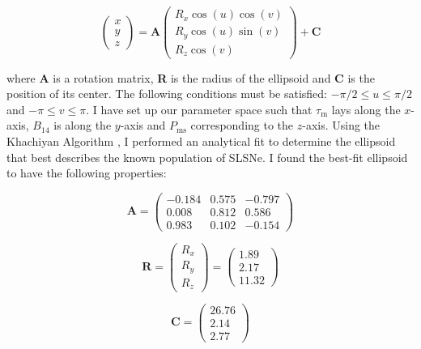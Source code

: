 \begin{equation}
\label{eq:Ellipsoid}
\left( \begin{matrix}
x \\
y \\
z
\end{matrix} \right)
=
\mathbf{A}
\left( \begin{matrix}
R_x\cos(u)\cos(v) \\
R_y\cos(u)\sin(v) \\
R_z\cos(v)
\end{matrix} \right)
+ \mathbf{C}
\end{equation}

\noindent where \textbf{A} is a rotation matrix, \textbf{R} is the radius of the ellipsoid and \textbf{C} is the position of its center. The following conditions must be satisfied: $-\pi /2 \leq u \leq \pi /2$ and $-\pi \leq v \leq \pi$. I have set up our parameter space such that $\tau_\mathrm{m}$ lays along the $x$-axis, $B_{14}$ is along the $y$-axis and $P_{\mathrm{ms}}$ corresponding to the $z$-axis. Using the Khachiyan Algorithm \citep{Aspvall19801,KHACHIYAN198053}, I performed an analytical fit to determine the ellipsoid that best describes the known population of SLSNe. I found the best-fit ellipsoid to have the following properties:

\begin{equation}
\label{eq:A}
\mathbf{A} =
\left( \begin{matrix}
-0.184 & 0.575 & -0.797\\
 0.008 & 0.812 & 0.586\\
0.983 & 0.102 & -0.154
\end{matrix} \right)
\end{equation}

\begin{equation}
\label{eq:R}
\mathbf{R} =
\left( \begin{matrix}
R_x \\
R_y \\
R_z
\end{matrix} \right)
=
\left( \begin{matrix}
1.89\\
2.17\\
11.32
\end{matrix} \right)
\end{equation}

\begin{equation}
\label{eq:C}
\mathbf{C} =
\left( \begin{matrix}
26.76 \\
2.14\\
2.77
\end{matrix} \right)
\end{equation}

